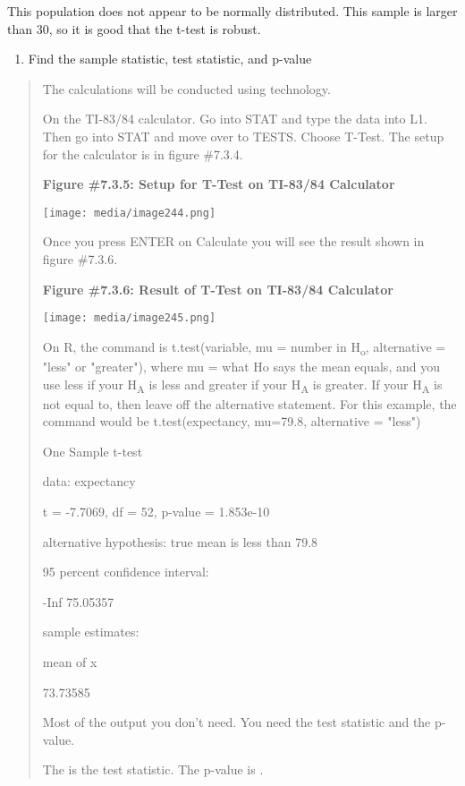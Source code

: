 \documentclass[]{book}
\providecommand{\tightlist}{%
  \setlength{\itemsep}{0pt}\setlength{\parskip}{0pt}}
\begin{document}
This population does not appear to be normally distributed. This sample
is larger than 30, so it is good that the t-test is robust.

\begin{enumerate}
\def\labelenumi{\arabic{enumi}.}
\setcounter{enumi}{3}
\tightlist
\item
  Find the sample statistic, test statistic, and p-value
\end{enumerate}

\begin{quote}
The calculations will be conducted using technology.

On the TI-83/84 calculator. Go into STAT and type the data into L1.
Then go into STAT and move over to TESTS. Choose T-Test. The setup for
the calculator is in figure \#7.3.4.

\textbf{Figure \#7.3.5: Setup for T-Test on TI-83/84 Calculator}

\texttt{[image: media/image244.png]}

Once you press ENTER on Calculate you will see the result shown in
figure \#7.3.6.

\textbf{Figure \#7.3.6: Result of T-Test on TI-83/84 Calculator}

\texttt{[image: media/image245.png]}

On R, the command is t.test(variable, mu = number in H\textsubscript{o}, alternative
= "less" or "greater"), where mu = what Ho says the mean equals,
and you use less if your H\textsubscript{A} is less and greater if your H\textsubscript{A} is
greater. If your H\textsubscript{A} is not equal to, then leave off the alternative
statement. For this example, the command would be t.test(expectancy,
mu=79.8, alternative = "less")

One Sample t-test

data: expectancy

t = -7.7069, df = 52, p-value = 1.853e-10

alternative hypothesis: true mean is less than 79.8

95 percent confidence interval:

-Inf 75.05357

sample estimates:

mean of x

73.73585

Most of the output you don't need. You need the test statistic and the
p-value.

The is the test statistic. The p-value is .
\end{quote}
\end{document}
